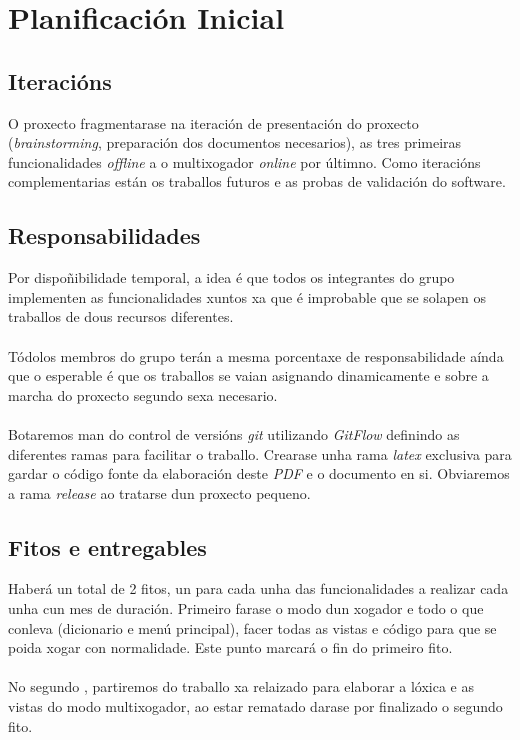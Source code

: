 \chapter{Planificación Inicial}
\label{chap:plan_inicial}

\section{Iteracións}
O proxecto fragmentarase na iteración de presentación do proxecto (\textit{brainstorming}, preparación dos documentos necesarios), as tres primeiras funcionalidades \textit{offline} a o multixogador \textit{online} por últimno. Como iteracións complementarias están os traballos futuros e as probas de validación do software.

\section{Responsabilidades}
Por dispoñibilidade temporal, a idea é que todos os integrantes do grupo implementen as funcionalidades xuntos xa que é improbable que se solapen os traballos de dous recursos diferentes.\\
\\
Tódolos membros do grupo terán a mesma porcentaxe de responsabilidade aínda que o esperable é que os traballos se vaian asignando dinamicamente e sobre a marcha do proxecto segundo sexa necesario.\\
\\
Botaremos man do control de versións \textit{git} utilizando \textit{GitFlow} definindo as diferentes ramas para facilitar o traballo. Crearase unha rama \textit{latex} exclusiva para gardar o código fonte da elaboración deste \textit{PDF} e o documento en si. Obviaremos a rama \textit{release} ao tratarse dun proxecto pequeno.

\section{Fitos e entregables}
Haberá un total de 2
fitos, un para cada unha das funcionalidades a realizar cada unha cun mes de duración. Primeiro farase o modo dun xogador e todo o que conleva (dicionario e menú principal), facer todas as vistas e código para que se poida xogar con normalidade. Este punto marcará o fin do primeiro fito.\\
\\
No segundo , partiremos do traballo xa relaizado para elaborar a lóxica e as vistas do modo multixogador, ao estar rematado darase por finalizado o segundo fito.


